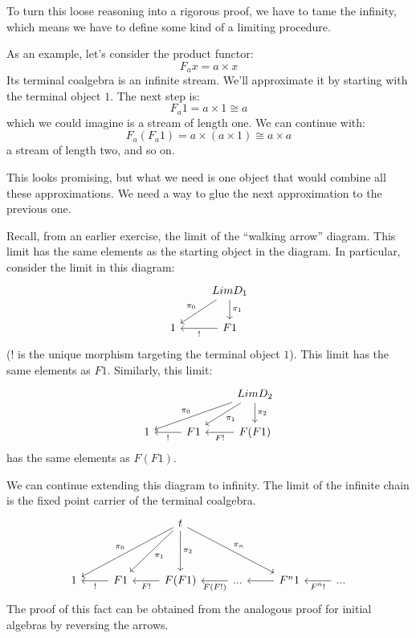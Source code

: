 \documentclass[DaoFP]{subfiles}
\begin{document}
To turn this loose reasoning into a rigorous proof, we have to tame the infinity, which means we have to define some kind of a limiting procedure. 

As an example, let's consider the product functor:
\[F_a x = a \times x \]
Its terminal coalgebra is an infinite stream. We'll approximate it by starting with the terminal object $1$. The next step is:
\[ F_a 1 = a \times 1 \cong a \]
which we could imagine is a stream of length one. We can continue with:
\[ F_a (F_a 1) = a \times (a \times 1) \cong a \times a \]
a stream of length two, and so on. 

This looks promising, but what we need is one object that would combine all these approximations. We need a way to glue the next approximation to the previous one.

Recall, from an earlier exercise, the limit of the ``walking arrow'' diagram. This limit has the same elements as the starting object in the diagram. In particular, consider the limit in this diagram:
\[
 \begin{tikzcd}
 & Lim D_1
 \arrow[dl, "\pi_0"']
\arrow[d, "\pi_1"]
 \\
 1 
 & F1
 \arrow[l, "!"]
 \end{tikzcd}
\]
($!$ is the unique morphism targeting the terminal object $1$). This limit has the same elements as $F 1$. Similarly, this limit:
\[
 \begin{tikzcd}
 && Lim D_2
 \arrow[dll, "\pi_0"']
\arrow[dl, "\pi_1"]
\arrow[d, "\pi_2"]
 \\
 1 
 & F1
 \arrow[l, "!"]
  & F(F 1)
 \arrow[l, "F !"]
\end{tikzcd}
\]
has the same elements as $F(F 1)$.

We can continue extending this diagram to infinity. The limit of the infinite chain is the fixed point carrier of the terminal coalgebra.
\[
 \begin{tikzcd}
  && t
  \arrow[ddll, "\pi_0"']
  \arrow[ddl, "\pi_1"]
  \arrow[dd, "\pi_2"]
  \arrow[ddrr, "\pi_n"]
\\
\\
 1 
 & F 1
 \arrow[l, "!"]
 & F (F 1)
 \arrow[l, "F !"]
 & ...
 \arrow[l, "F(F !)"]
 & F^n 1
  \arrow[l]
 & ...
  \arrow[l, "F^n !"]
 \end{tikzcd}
\]
The proof of this fact can be obtained from the analogous proof for initial algebras by reversing the arrows.
\end{document}
